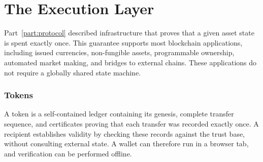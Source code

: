 \part{The Execution Layer}\label{part:execution}

Part~\ref{part:protocol} described infrastructure that proves that a given asset state is spent exactly once. This guarantee supports most blockchain applications, including issued currencies, non-fungible assets, programmable ownership, automated market making, and bridges to external chains. These applications do not require a globally shared state machine.

\section{Tokens}

A token is a self-contained ledger containing its genesis, complete transfer sequence, and certificates proving that each transfer was recorded exactly once. A recipient establishes validity by checking these records against the trust base, without consulting external state. A wallet can therefore run in a browser tab, and verification can be performed offline.


